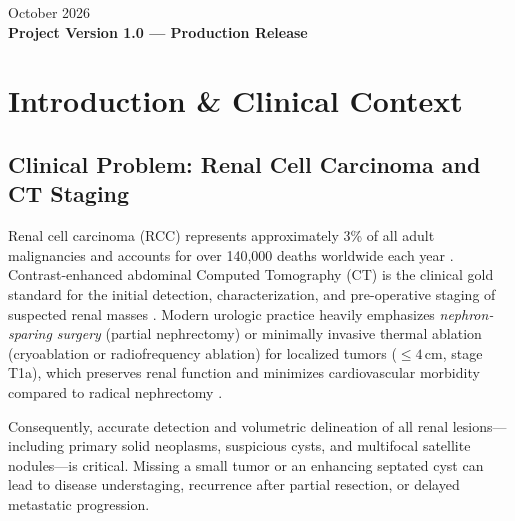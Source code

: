 \documentclass[11pt,a4paper]{report}
\begin{document}
\begin{titlepage}
    \vspace{1.5cm}
    {\large October 2026}\\[0.2cm]
    \textbf{Project Version 1.0 --- Production Release}
\end{titlepage}

\tableofcontents
\newpage

\chapter{Introduction \& Clinical Context}

\section{Clinical Problem: Renal Cell Carcinoma and CT Staging}
Renal cell carcinoma (RCC) represents approximately 3\% of all adult malignancies and accounts for over 140,000 deaths worldwide each year \cite{Campbell2021aua,Ljungberg2022eau}. Contrast-enhanced abdominal Computed Tomography (CT) is the clinical gold standard for the initial detection, characterization, and pre-operative staging of suspected renal masses \cite{Amin2017ajcc}. Modern urologic practice heavily emphasizes \emph{nephron-sparing surgery} (partial nephrectomy) or minimally invasive thermal ablation (cryoablation or radiofrequency ablation) for localized tumors ($\le 4$\,cm, stage T1a), which preserves renal function and minimizes cardiovascular morbidity compared to radical nephrectomy \cite{Amin2017ajcc}.

Consequently, accurate detection and volumetric delineation of all renal lesions---including primary solid neoplasms, suspicious cysts, and multifocal satellite nodules---is critical. Missing a small tumor or an enhancing septated cyst can lead to disease understaging, recurrence after partial resection, or delayed metastatic progression.
\end{document}
